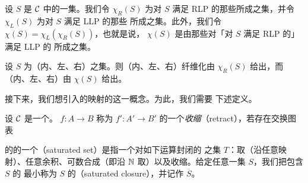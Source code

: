 \begin{definition}\label{def:chi}
设 $S$ 是\trCategory{} $\mathcal{C}$ 中的一集\trMorphism{}。我们令 $\chi_R(S)$ 为对 $S$ 满足
RLP 的那些\trMorphism{}所成之集，并令 $\chi_L(S)$ 为对 $S$ 满足 LLP 的那些%
\trMorphism{}所成之集。此外，我们令 $\chi(S) = \chi_L(\chi_R(S))$，也就是说，%
$\chi(S)$ 是由那些对「对 $S$ 满足 RLP 的\trMorphism{}」满足 LLP 的\trMorphism{}%
所成之集。
\end{definition}

\begin{example*}
设 $S$ 为（内、左、右）\trHornInclusion{}之集。则（内、左、右）纤维化由 $\chi_R(S)$
给出，而（内、左、右）\trAnodyneMap{}由 $\chi(S)$ 给出。
\end{example*}

接下来，我们想引入\trSimplicialSet{}的映射的\trSaturatedSet{}这一概念。为此，我们需要
下述定义。

\begin{definition}\label{def:retract}
设 $\mathcal{C}$ 是一个\trCategory{}。\trMorphism{} $f\colon A \to B$ 称为\trMorphism{}%
$f'\colon A' \to B'$ 的一个\emph{收缩}（retract），若存在交换图表
\begin{center}
\end{center}
\end{definition}

\begin{definition}\label{def:saturated-set}
\trSimplicialSet{}的\trMorphism{}的一个\emph{\trSaturatedSet{}}（saturated set）是指一个对如下运算封闭的%
\trMorphism{}之集 $T$：取\trPushout{}（沿任意映射）、任意余积、可数合成（即沿
$\mathbb{N}$ 取\trColimit{}）以及收缩。给定任意一集\trMorphism{} $S$，我们把包含 $S$ 的
最小\trSaturatedSet{}称为 $S$ 的\emph{\trSaturation{}}（saturated closure），并记作
$\overline{S}$。
\end{definition}

